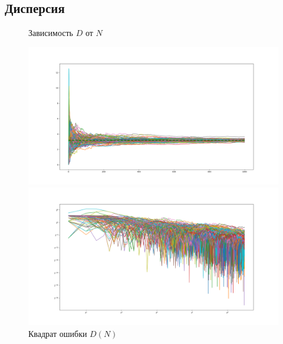 \documentclass[a4paper,12pt,answers,noaddpoints]{exam}
\begin{document}
\subsection{Дисперсия}
\begin{figure}[h!]
\centering
\begin{minipage}[h!]{1.1\linewidth}
\caption{Зависимость $D$ от $N$}
\includegraphics[width=1\linewidth]{../pngs/disp_N.png}
\end{minipage}
\vfill
\begin{minipage}[h!]{1.1\linewidth}
    \caption{Квадрат ошибки $D(N)$}
\includegraphics[width=1\linewidth]{../pngs/disps_err.png}
\end{minipage}
\end{figure}

\pagebreak
\end{document}
